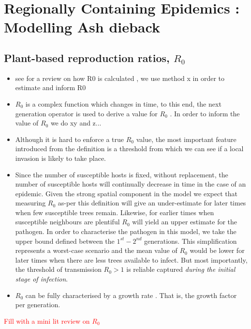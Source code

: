 \chapter{Regionally Containing Epidemics : Modelling Ash dieback}

\section{Plant-based reproduction ratios, $R_0$}

\begin{itemize}
    \item see for a review on how R0 is calculated \cite{perspectives-on-r0}, we use method x in order to estimate and inform R0
    \item $R_0$ is a complex function which changes in time, to this end, the next generation operator is used to derive a value for $R_0$ \cite{doi:10.1098/rsif.2009.0386}. In order to inform the value of $R_0$ we do xy and z...
    \item Although it is hard to enforce a true $R_0$ value, the most important feature introduced from the definition is a threshold from which we can see if a local invasion is likely to take place.
    \item Since the number of susceptible hosts is fixed, without replacement, the number of susceptible hosts will continually decrease in time in the case of an epidemic. Given the strong spatial component in the model we expect that measuring $R_0$ as-per this definition will give an under-estimate for later times when few susceptible trees remain. Likewise, for earlier times when susceptible neighbours are plentiful $R_0$ will yield an upper estimate for the pathogen. In order to characterise the pathogen in this model, we take the upper bound defined between the $1^{st}-2^{nd}$ generations. This simplification represents a worst-case scenario and the mean value of $R_0$ would be lower for later times when there are less trees available to infect. But most importantly, the threshold of transmission $R_0>1$ is reliable captured \textit{during the initial stage of infection}.
    \item $R_0$ can be fully characterised by a growth rate \cite{R0-construct}. That is, the growth factor per generation.
    
\end{itemize}

\textcolor{red}{Fill with a mini lit review on $R_0$}


